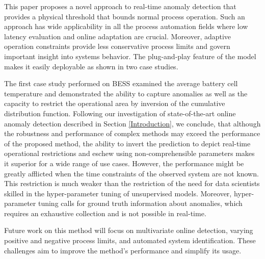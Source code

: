 This paper proposes a novel approach to real-time anomaly detection that provides a physical threshold that bounds normal process operation. Such an approach has wide applicability in all the process automation fields where low latency evaluation and online adaptation are crucial. Moreover, adaptive operation constraints provide less conservative process limits and govern important insight into systems behavior. The plug-and-play feature of the model makes it easily deployable as shown in two case studies.

The first case study performed on BESS examined the average battery cell temperature and demonstrated the ability to capture anomalies as well as the capacity to restrict the operational area by inversion of the cumulative distribution function. Following our investigation of state-of-the-art online anomaly detection described in Section \ref{Introduction}, we conclude, that although the robustness and performance of complex methods may exceed the performance of the proposed method, the ability to invert the prediction to depict real-time operational restrictions and eschew using non-comprehensible parameters makes it superior for a wide range of use cases. However, the performance might be greatly afflicted when the time constraints of the observed system are not known. This restriction is much weaker than the restriction of the need for data scientists skilled in the hyper-parameter tuning of unsupervised models. Moreover, hyper-parameter tuning calls for ground truth information about anomalies, which requires an exhaustive collection and is not possible in real-time.

Future work on this method will focus on multivariate online detection, varying positive and negative process limits, and automated system identification. These challenges aim to improve the method's performance and simplify its usage.



